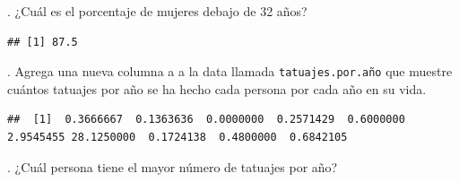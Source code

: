 \documentclass[
]{book}
\newenvironment{Shaded}{\begin{snugshade}}{\end{snugshade}}
\newcommand{\DecValTok}[1]{\textcolor[rgb]{0.00,0.00,0.81}{#1}}
\newcommand{\FunctionTok}[1]{\textcolor[rgb]{0.13,0.29,0.53}{\textbf{#1}}}
\newcommand{\NormalTok}[1]{#1}
\newcommand{\OtherTok}[1]{\textcolor[rgb]{0.56,0.35,0.01}{#1}}
\newcommand{\SpecialCharTok}[1]{\textcolor[rgb]{0.81,0.36,0.00}{\textbf{#1}}}
\newcommand{\StringTok}[1]{\textcolor[rgb]{0.31,0.60,0.02}{#1}}
\begin{document}
\hfill{}.
¿Cuál es el porcentaje de mujeres debajo de 32 años?\\

\begin{Shaded}
\end{Shaded}

\begin{verbatim}
## [1] 87.5
\end{verbatim}

\hfill{}.
Agrega una nueva columna a a la data llamada \texttt{tatuajes.por.año} que muestre cuántos tatuajes por año se ha hecho cada persona por cada año en su vida.\\

\begin{Shaded}
\end{Shaded}

\begin{verbatim}
##  [1]  0.3666667  0.1363636  0.0000000  0.2571429  0.6000000  2.9545455 28.1250000  0.1724138  0.4800000  0.6842105
\end{verbatim}

\hfill{}.
¿Cuál persona tiene el mayor número de tatuajes por año?\\

\begin{Shaded}
\end{Shaded}
\end{document}
